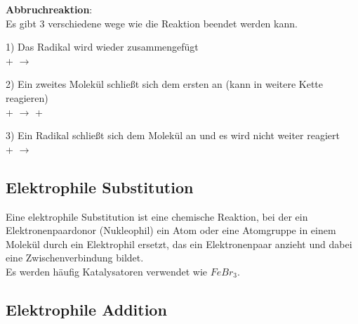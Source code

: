 \vspace{0.5cm}

\textbf{Abbruchreaktion}: \\
Es gibt 3 verschiedene wege wie die Reaktion beendet werden kann.

1) Das Radikal wird wieder zusammengefügt \\
\hspace{0.3cm}
+
\hspace{0.3cm}
\hspace{0.3cm}
$\longrightarrow$
\hspace{0.3cm}

2) Ein zweites Molekül schließt sich dem ersten an (kann in weitere Kette reagieren) \\
\hspace{0.3cm}
+
\hspace{0.3cm}
\hspace{0.3cm}
$\longrightarrow$
\hspace{0.3cm}
\hspace{0.3cm}
+
\hspace{0.3cm}

3) Ein Radikal schließt sich dem Molekül an und es wird nicht weiter reagiert \\
\hspace{0.3cm}
+
\hspace{0.3cm}
\hspace{0.3cm}
$\longrightarrow$
\hspace{0.3cm}


\subsection{Elektrophile Substitution}
Eine elektrophile Substitution ist eine chemische Reaktion, bei der ein Elektronenpaardonor (Nukleophil) ein Atom oder eine Atomgruppe in einem Molekül durch ein Elektrophil ersetzt, das ein Elektronenpaar anzieht und dabei eine Zwischenverbindung bildet. \\
Es werden häufig Katalysatoren verwendet wie $FeBr_3$.



\subsection{Elektrophile Addition}

